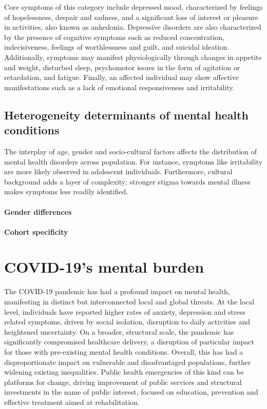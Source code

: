             Core symptoms of this category include depressed mood, characterized by feelings of hopelessness, despair and sadness, and a significant loss of interest or pleasure in activities, also known as anhedonia. Depressive disorders are also characterized by the presence of cognitive symptoms such as reduced concentration, indecisiveness, feelings of worthlessness and guilt, and suicidal ideation. Additionally, symptoms may manifest physiologically through changes in appetite and weight, disturbed sleep, psychomotor issues in the form of agitation or retardation, and fatigue. Finally, an affected individual may show affective manifestations such as a lack of emotional responsiveness and irritability. 


\subsection{Heterogeneity determinants of mental health conditions}
    The interplay of age, gender and socio-cultural factors affects the distribution of mental health disorders across population. For instance, symptoms like irritability are more likely observed in adolescent individuals. Furthermore, cultural background adds a layer of complexity; stronger stigma towards mental illness makes symptoms less readily identified. 
\paragraph{Gender differences}



\paragraph{Cohort specificity}



\section{COVID-19's mental burden}
    The COVID-19 pandemic has had a profound impact on mental health, manifesting in distinct but interconnected local and global threats. At the local level, individuals have reported higher rates of anxiety, depression and stress related symptoms, driven by social isolation, disruption to daily activities and heightened uncertainty. On a broader, structural scale, the pandemic has significantly compromised healthcare delivery, a disruption of particular impact for those with pre-existing mental health conditions. Overall, this has had a disproportionate impact on vulnerable and disadvantaged populations, further widening existing inequalities. 
    Public health emergencies of this kind can be platforms for change, driving improvement of public services and structural investments in the name of public interest, focused on education, prevention and effective treatment aimed at rehabilitation. 

